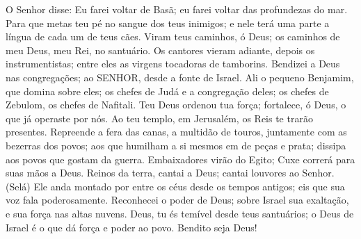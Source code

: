 {  O Senhor disse: Eu
{} farei voltar de Basã; eu
{} farei voltar das profundezas do mar.
  Para que metas teu pé no sangue dos teus inimigos; e nele
{} terá uma parte a língua de cada um de teus cães.
  Viram teus caminhos, ó Deus; os caminhos de meu Deus, meu Rei, no santuário.
  Os cantores vieram adiante, depois os instrumentistas; entre eles as virgens tocadoras de tamborins.
  Bendizei a Deus nas congregações;
{} ao SENHOR, desde a fonte de Israel.
  Ali
{} o pequeno Benjamim, que domina sobre eles; os chefes de Judá e a congregação deles; os chefes de Zebulom,
{} os chefes de Nafitali.
  Teu Deus ordenou tua força; fortalece, ó Deus, o que já operaste por nós.
  Ao teu templo, em Jerusalém, os Reis te trarão presentes.
  Repreende a fera das canas, a multidão de touros, juntamente com as bezerras dos povos; aos que humilham a si mesmos em
{} de peças e prata; dissipa aos povos que gostam da guerra.
  Embaixadores virão do Egito; Cuxe correrá para
{} suas mãos a Deus.
  Reinos da terra, cantai a Deus; cantai louvores ao Senhor. (Selá)
  Ele anda montado por entre os céus desde os tempos antigos; eis que sua voz fala poderosamente.
  Reconhecei o poder de Deus; sobre Israel
{} sua exaltação, e sua força
{} nas altas nuvens.
  Deus, tu és temível desde teus santuários; o Deus de Israel é o que dá força e poder ao povo. Bendito seja Deus!
\par }


